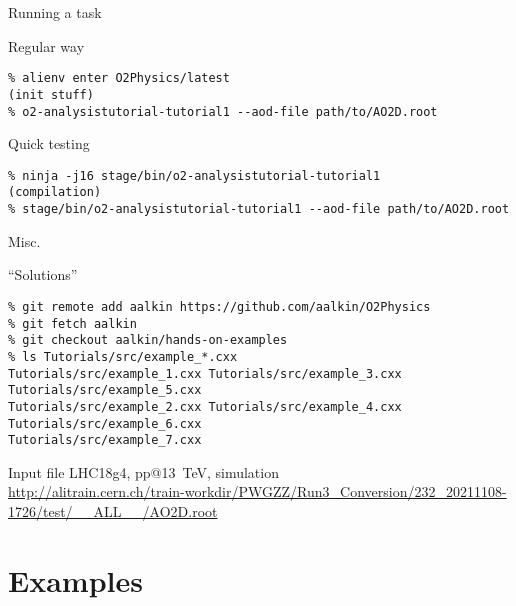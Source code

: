 \documentclass[10pt,lualatex,xcolor={table,svgnames},{hyperref={bookmarks=true,linktoc=all}},aspectratio=169]{beamer}
\begin{document}
\begin{frame}[fragile]{Running a task}
\begin{block}{Regular way}
\begin{verbatim}
% alienv enter O2Physics/latest
(init stuff)
% o2-analysistutorial-tutorial1 --aod-file path/to/AO2D.root
\end{verbatim}
\vspace{0.5ex}
\end{block}
\vspace{1em}
\begin{block}{Quick testing}
\begin{verbatim}
% ninja -j16 stage/bin/o2-analysistutorial-tutorial1
(compilation)
% stage/bin/o2-analysistutorial-tutorial1 --aod-file path/to/AO2D.root
\end{verbatim}
\vspace{0.5ex}
\end{block}
\end{frame}

\begin{frame}[fragile]{Misc.}
\begin{block}{\enquote{Solutions}}
\begin{verbatim}
% git remote add aalkin https://github.com/aalkin/O2Physics
% git fetch aalkin
% git checkout aalkin/hands-on-examples
% ls Tutorials/src/example_*.cxx
Tutorials/src/example_1.cxx Tutorials/src/example_3.cxx Tutorials/src/example_5.cxx
Tutorials/src/example_2.cxx Tutorials/src/example_4.cxx Tutorials/src/example_6.cxx
Tutorials/src/example_7.cxx
\end{verbatim}
\vspace{0.5ex}
\end{block}
\begin{block}{Input file}
LHC18g4, pp@13~TeV, simulation \\
\href{http://alitrain.cern.ch/train-workdir/PWGZZ/Run3_Conversion/232_20211108-1726/test/__ALL__/AO2D.root}{http://alitrain.cern.ch/train-workdir/PWGZZ/Run3\_Conversion/232\_20211108-1726/test/\_\_ALL\_\_/AO2D.root}
\end{block}
\end{frame}

\section{Examples}
\end{document}

